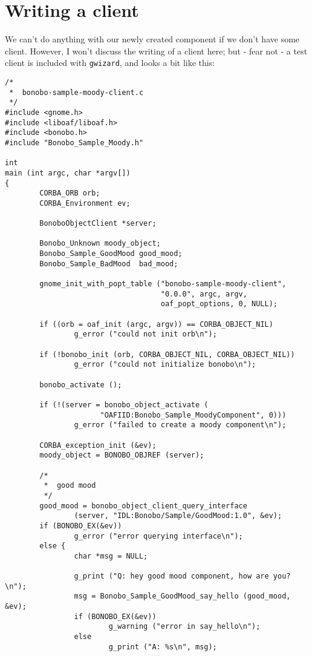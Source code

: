 \documentclass[final,10pt]{article}
\newcommand{\gwizard}{{\tt gwizard}}
\begin{document}
\section{Writing a client}
We can't do anything with our newly created component if we don't have
some client. However, I won't discuss the writing of a client here;
but - fear not - a test client is included with \gwizard{}, and looks
a bit like this:
\begin{verbatim}
/*
 *  bonobo-sample-moody-client.c
 */
#include <gnome.h>
#include <liboaf/liboaf.h>
#include <bonobo.h>
#include "Bonobo_Sample_Moody.h"

int
main (int argc, char *argv[])
{
        CORBA_ORB orb;
        CORBA_Environment ev;

        BonoboObjectClient *server;

        Bonobo_Unknown moody_object;
        Bonobo_Sample_GoodMood good_mood;
        Bonobo_Sample_BadMood  bad_mood;
        
        gnome_init_with_popt_table ("bonobo-sample-moody-client", 
                                    "0.0.0", argc, argv,
                                    oaf_popt_options, 0, NULL);
        
        if ((orb = oaf_init (argc, argv)) == CORBA_OBJECT_NIL)
                g_error ("could not init orb\n");
        
        if (!bonobo_init (orb, CORBA_OBJECT_NIL, CORBA_OBJECT_NIL))
                g_error ("could not initialize bonobo\n");

        bonobo_activate ();
        
        if (!(server = bonobo_object_activate (
                      "OAFIID:Bonobo_Sample_MoodyComponent", 0)))
                g_error ("failed to create a moody component\n");
        
        CORBA_exception_init (&ev);
        moody_object = BONOBO_OBJREF (server);

        /*
         *  good mood
         */
        good_mood = bonobo_object_client_query_interface 
                (server, "IDL:Bonobo/Sample/GoodMood:1.0", &ev);
        if (BONOBO_EX(&ev))
                g_error ("error querying interface\n");
        else {
                char *msg = NULL;

                g_print ("Q: hey good mood component, how are you?\n");
                msg = Bonobo_Sample_GoodMood_say_hello (good_mood, &ev);
                if (BONOBO_EX(&ev)) 
                        g_warning ("error in say_hello\n");
                else
                        g_print ("A: %s\n", msg);
                

\end{verbatim}
\end{document}
